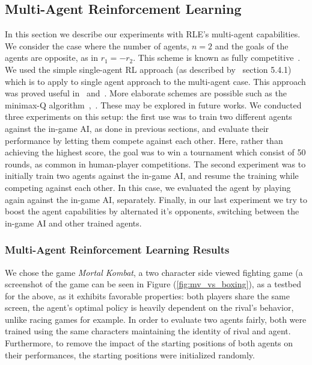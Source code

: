 \documentclass{article}
\begin{document}
\subsection{Multi-Agent Reinforcement Learning}
In this section we describe our experiments with RLE's multi-agent capabilities.
We consider the case where the number of agents, $n=2$ and the goals of the agents are opposite, as in $r_1=-r_2$. This scheme is known as fully competitive~\citep{bucsoniu2010multi}. We used the simple single-agent RL approach (as described by~\citet{bucsoniu2010multi} section 5.4.1) which is to apply to single agent approach to the multi-agent case. This approach was proved useful in~\citet{crites1996improving} and~\citet{mataric1997reinforcement}. More elaborate schemes are possible such as the minimax-Q algorithm~\citep{littman1994markov},~\citep{littman2001value}. These may be explored in future works.
We conducted three experiments on this setup: the first use was to train two different agents against the in-game AI, as done in previous sections, and evaluate their performance by letting them compete against each other. 
Here, rather than achieving the highest score, the goal was to win a tournament which consist of 50 rounds, as common in human-player competitions.
The second experiment was to initially train two agents against the in-game AI, and resume the training while competing against each other.
In this case, we evaluated the agent by playing again against the in-game AI, separately.
Finally, in our last experiment we try to boost the agent capabilities by alternated it's opponents, switching between the in-game AI and other trained agents.


\subsubsection{Multi-Agent Reinforcement Learning Results}
We chose the game \textit{Mortal Kombat}, a two character side viewed fighting game (a screenshot of the game can be seen in Figure (\ref{fig:mv_vs_boxing}),  as a testbed for the above, as it exhibits favorable properties: both players share the same screen, the agent's optimal policy is heavily dependent on the rival's behavior, unlike racing games for example.
In order to evaluate two agents fairly, both were trained using the same characters maintaining the identity of rival and agent. Furthermore, to remove the impact of the starting positions of both agents on their performances, the starting positions were initialized randomly.
\end{document}

